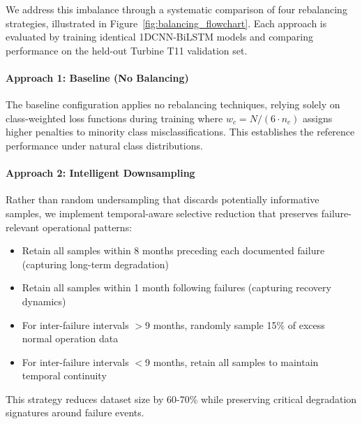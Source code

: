 \documentclass[12pt]{article}
\begin{document}
We address this imbalance through a systematic comparison of four rebalancing strategies, illustrated in Figure~\ref{fig:balancing_flowchart}. Each approach is evaluated by training identical 1DCNN-BiLSTM models and comparing performance on the held-out Turbine T11 validation set.


\paragraph{Approach 1: Baseline (No Balancing)}
The baseline configuration applies no rebalancing techniques, relying solely on class-weighted loss functions during training where $w_c = N/(6 \cdot n_c)$ assigns higher penalties to minority class misclassifications. This establishes the reference performance under natural class distributions.

\paragraph{Approach 2: Intelligent Downsampling}
Rather than random undersampling that discards potentially informative samples, we implement temporal-aware selective reduction that preserves failure-relevant operational patterns:

\begin{itemize}
    \item Retain all samples within 8 months preceding each documented failure (capturing long-term degradation)
    \item Retain all samples within 1 month following failures (capturing recovery dynamics)
    \item For inter-failure intervals $>$9 months, randomly sample 15\% of excess normal operation data
    \item For inter-failure intervals $<$9 months, retain all samples to maintain temporal continuity
\end{itemize}

This strategy reduces dataset size by 60-70\% while preserving critical degradation signatures around failure events.
\end{document}
